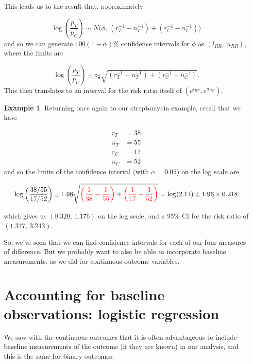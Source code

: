 \documentclass[
  openany]{book}
\theoremstyle{definition}
\theoremstyle{definition}
\newtheorem{example}{Example}[chapter]
\theoremstyle{definition}
\theoremstyle{definition}
\theoremstyle{remark}
\begin{document}
This leads us to the result that, approximately

\[\log\left(\frac{p_T}{p_C}\right) \sim N\bigg(\phi,\,\left(r_T^{-1} - n_T^{-1}\right) + \left(r_C^{-1} - n_C^{-1}\right) \bigg) \] and so we can generate \(100\left(1-\alpha\right)\)\% confidence intervals for \(\phi\) as \(\left(l_{RR},\;u_{RR}\right)\), where the limits are

\[
\log\left(\frac{p_T}{p_C}\right) \pm z_{\frac{\alpha}{2}}\sqrt{\left(r_T^{-1} - n_T^{-1}\right) + \left(r_C^{-1} - n_C^{-1}\right)}.
\]
This then translates to an interval for the risk ratio itself of \(\left(e^{l_{RR}},e^{u_{RR}}\right)\).

\begin{example}
Returning once again to our streptomycin example, recall that we have

\[
\begin{aligned}
r_T & = 38\\
n_T & = 55 \\
r_C & = 17 \\
n_C & = 52
\end{aligned}
\]
and so the limits of the confidence interval (with \(\alpha=0.05\)) on the log scale are

\[\log\left(\frac{38/55}{17/52}\right) \pm 1.96\sqrt{\color{red}{\left(\frac{1}{38} - \frac{1}{55}\right) + \left(\frac{1}{17} - \frac{1}{52}\right)}} = \log(2.11) \pm 1.96 \times 0.218\]

which gives us \(\left(0.320,\,1.176\right)\) on the log scale, and a 95\% CI for the risk ratio of \(\left(1.377,\,3.243\right)\).
\end{example}

So, we've seen that we can find confidence intervals for each of our four measures of difference. But we probably want to also be able to incorporate baseline measurements, as we
did for continuous outcome variables.

\hypertarget{accounting-for-baseline-observations-logistic-regression}{%
\section{Accounting for baseline observations: logistic regression}\label{accounting-for-baseline-observations-logistic-regression}}

We saw with the continuous outcomes that it is often advantageous to include baseline measurements of the outcome (if they are known) in our analysis, and this is the same for binary outcomes.
\end{document}
